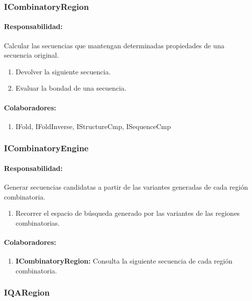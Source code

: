   \subsubsection{ICombinatoryRegion}
    \paragraph{Responsabilidad:} Calcular las secuencias que mantengan
determinadas propiedades de una secuencia original.    
      \begin{enumerate}
       \item Devolver la siguiente secuencia.
       \item Evaluar la bondad de una secuencia.
      \end{enumerate}
    \paragraph{Colaboradores:}
      \begin{enumerate}
       \item IFold, IFoldInverse, IStructureCmp, ISequenceCmp
      \end{enumerate}

  \subsubsection{ICombinatoryEngine}
    \paragraph{Responsabilidad:} Generar secuencias candidatas a partir de las
variantes generadas de cada regi\'on combinatoria.   
      \begin{enumerate}       
       \item Recorrer el espacio de b\'usqueda generado por las variantes de
las regiones combinatorias.
      \end{enumerate}
    \paragraph{Colaboradores:}
      \begin{enumerate}
       \item \textbf{ICombinatoryRegion:} Consulta la siguiente secuencia de
cada regi\'on combinatoria.
      \end{enumerate} 

  \subsubsection{IQARegion}

